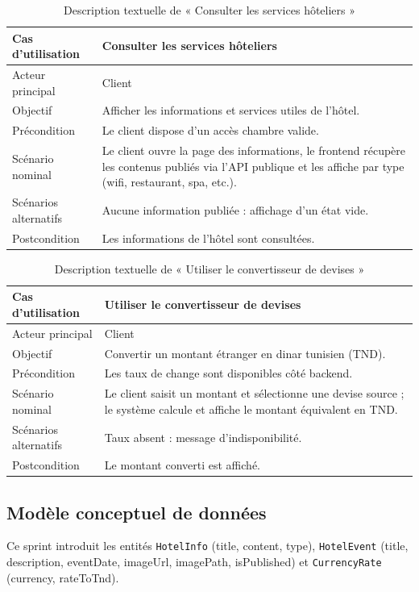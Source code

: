 \begin{table}[H]
\centering
\caption{Description textuelle de « Consulter les services hôteliers »}
\small
\begin{tabularx}{\textwidth}{|p{3.5cm}|X|}
\hline
Cas d'utilisation & Consulter les services hôteliers \\ \hline
Acteur principal & Client \\ \hline
Objectif & Afficher les informations et services utiles de l'hôtel. \\ \hline
Précondition & Le client dispose d'un accès chambre valide. \\ \hline
Scénario nominal & Le client ouvre la page des informations, le frontend récupère les contenus publiés via l'API publique et les affiche par type (wifi, restaurant, spa, etc.). \\ \hline
Scénarios alternatifs & Aucune information publiée : affichage d'un état vide. \\ \hline
Postcondition & Les informations de l'hôtel sont consultées. \\ \hline
\end{tabularx}
\end{table}

\begin{table}[H]
\centering
\caption{Description textuelle de « Utiliser le convertisseur de devises »}
\small
\begin{tabularx}{\textwidth}{|p{3.5cm}|X|}
\hline
Cas d'utilisation & Utiliser le convertisseur de devises \\ \hline
Acteur principal & Client \\ \hline
Objectif & Convertir un montant étranger en dinar tunisien (TND). \\ \hline
Précondition & Les taux de change sont disponibles côté backend. \\ \hline
Scénario nominal & Le client saisit un montant et sélectionne une devise source ; le système calcule et affiche le montant équivalent en TND. \\ \hline
Scénarios alternatifs & Taux absent : message d'indisponibilité. \\ \hline
Postcondition & Le montant converti est affiché. \\ \hline
\end{tabularx}
\end{table}

\subsection{Modèle conceptuel de données}
Ce sprint introduit les entités \texttt{HotelInfo} (title, content, type), \texttt{HotelEvent} (title, description, eventDate, imageUrl, imagePath, isPublished) et \texttt{CurrencyRate} (currency, rateToTnd).

